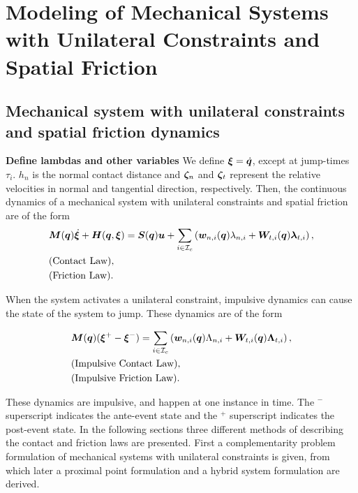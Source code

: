 \documentclass[../DC2017114Bouma.tex]{subfiles}
\begin{document}
\graphicspath{{02_Material/img/}}


\cleartooddpage
\chapter{Modeling of Mechanical Systems with Unilateral Constraints and Spatial Friction}
\section{Mechanical system with unilateral constraints and spatial friction dynamics}
\textbf{Define lambdas and other variables}
We define $\boldsymbol{\xi}=\dot{{\boldsymbol{q}}}$, except at jump-times $\tau_i$. $h_n$ is the normal contact distance and $\boldsymbol{\zeta}_{n}$ and $\boldsymbol{\zeta}_{t}$ represent the relative velocities in normal and tangential direction,  respectively. Then, the continuous dynamics of a mechanical system with unilateral constraints and spatial friction are of the form
\begin{align}
&{\boldsymbol{M}}({\boldsymbol{q}})\dot{\boldsymbol{\xi}} + {\boldsymbol{H}}({\boldsymbol{q}},\boldsymbol{\xi}) = {\boldsymbol{S}}({\boldsymbol{q}}){\boldsymbol{u}} + \sum_{i\in\mathcal{I}_c}\left({\boldsymbol{w}}_{n,i}({\boldsymbol{q}})\lambda_{n,i} + {\boldsymbol{W}}_{t,i}({\boldsymbol{q}})\boldsymbol{\lambda}_{t,i} \right), \label{eq:appcont1}\\
&\text{(Contact Law)},\label{eq:appcont2}\\
&\text{(Friction Law)}.\label{eq:appcont3}
\end{align}

When the system activates a unilateral constraint, impulsive dynamics can cause the state of the system to jump. These dynamics are of the form

\begin{align}
&{\boldsymbol{M}}({\boldsymbol{q}})(\boldsymbol{\xi}^+ - \boldsymbol{\xi}^-) = \sum_{i\in\mathcal{I}_c}\left( {\boldsymbol{w}}_{n,i}({\boldsymbol{q}})\Lambda_{n,i} + {\boldsymbol{W}}_{t,i}({\boldsymbol{q}})\boldsymbol{\Lambda}_{t,i}\right), \label{eq:appimp1}\\
&\text{(Impulsive Contact Law)},\label{eq:appimp2}\\
&\text{(Impulsive Friction Law)}.\label{eq:appimp3}
\end{align}

These dynamics are impulsive, and happen at one instance in time. The $^-$ superscript indicates the ante-event state and the $^+$ superscript indicates the post-event state. In the following sections three different methods of describing the contact and friction laws are presented. First a complementarity problem formulation of mechanical systems with unilateral constraints is given, from which later a proximal point formulation and a hybrid system formulation are derived.
\end{document}
